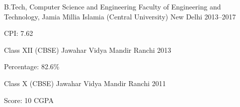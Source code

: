 
\begin{cventries}

\cventry%
  {B.Tech, Computer Science and Engineering} %
  {Faculty of Engineering and Technology, Jamia Millia Islamia (Central
   University)} %
  {New Delhi} %
  {2013--2017} %
  {%
    \begin{cvitems}%
      \item{CPI: 7.62}
    \end{cvitems}
  }

\cventry%
  {Class XII (CBSE)} %
  {Jawahar Vidya Mandir} %
  {Ranchi} %
  {2013} %
  {%
    \begin{cvitems} %
      \item{Percentage: 82.6\%}
    \end{cvitems}
  }

\cventry%
  {Class X (CBSE)} %
  {Jawahar Vidya Mandir} %
  {Ranchi} %
  {2011} %
  {%
    \begin{cvitems} %
      \item{Score: 10 CGPA}
    \end{cvitems}
  }

\end{cventries}
